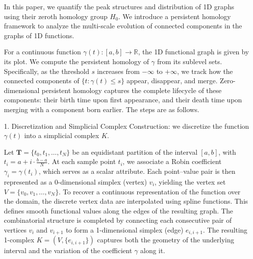 \documentclass{ws-mplb}
\begin{document}
 In this paper, we quantify the peak structures and distribution of 1D graphs using their zeroth homology group \(H_0\).
We introduce a persistent homology framework to analyze the multi-scale evolution of connected components in the graphs of 1D functions.

 For a continuous function \(\gamma(t): [a,b] \to \mathbb{R}\), the 1D functional graph is given by its plot. We compute the persistent homology of \(\gamma\) from its sublevel sets.
Specifically, as the threshold \(s\) increases from \(-\infty\) to \(+\infty\), we track how the connected components of \(\{t: \gamma(t) \le s\}\) appear, disappear, and merge.
Zero-dimensional persistent homology captures the complete lifecycle of these components: their birth time upon first appearance, and their death time upon merging with a component born earlier.
The steps are as follows.

1. Discretization and Simplicial Complex Construction: we discretize the function  $\gamma(t)$ into a simplicial complex $K$.


Let \( \mathbf{T} = \{t_0, t_1, \dots, t_N\} \) be an equidistant partition of the interval \([a, b]\), with \( t_i = a + i \cdot \frac{b-a}{N} \). At each sample point \( t_i \), we associate a Robin coefficient \( \gamma_i = \gamma(t_i) \), which serves as a scalar attribute. Each point–value pair is then represented as a 0-dimensional simplex (vertex) \( v_i \), yielding the vertex set \( V = \{v_0, v_1, \dots, v_N\} \).
To recover a continuous representation of the function over the domain, the discrete vertex data are interpolated using spline functions. This defines smooth functional values along the edges of the resulting graph. The combinatorial structure is completed by connecting each consecutive pair of vertices \( v_i \) and \( v_{i+1} \) to form a 1-dimensional simplex (edge) \( e_{i, i+1} \). The resulting 1-complex \( K = (V, \{e_{i,i+1}\}) \) captures both the geometry of the underlying interval and the variation of the coefficient \( \gamma \) along it.
\end{document}
